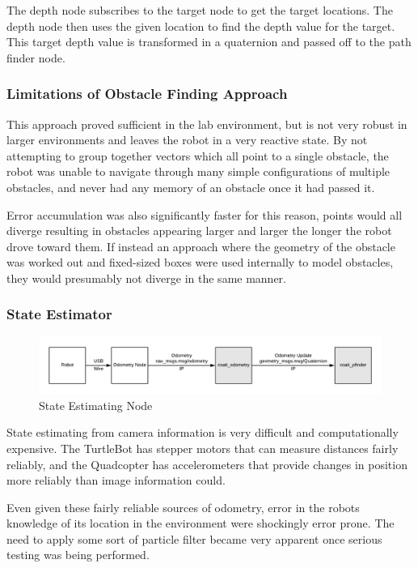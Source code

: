 \documentclass{article}[12]
\begin{document}
 	The depth node subscribes to the target node to get the target locations. The depth node then uses the given location to find the depth value for the target. This target depth value is transformed in a quaternion and passed off to the path finder node. 
 
 \subsubsection{Limitations of Obstacle Finding Approach}
 
 This approach proved sufficient in the lab environment, but is not very robust in larger environments and leaves the robot in a very reactive state. By not attempting to group together vectors which all point to a single obstacle, the robot was unable to navigate through many simple configurations of multiple obstacles, and never had any memory of an obstacle once it had passed it. 
 
 Error accumulation was also significantly faster for this reason, points would all diverge resulting in obstacles appearing larger and larger the longer the robot drove toward them. If instead an approach where the geometry of the obstacle was worked out and fixed-sized boxes were used internally to model obstacles, they would presumably not diverge in the same manner. 
	
	\subsubsection{State Estimator}
	
	\begin{figure}[H]
		\centering
		\includegraphics[width=0.9\linewidth]{OdometryDigram.png}
		\caption{State Estimating Node}
		\label{fig:state}
	\end{figure}

	State estimating from camera information is very difficult and computationally expensive. The TurtleBot has stepper motors that can measure distances fairly reliably, and the Quadcopter has accelerometers that provide changes in position more reliably than image information could. 
	
	Even given these fairly reliable sources of odometry, error in the robots knowledge of its location in the environment were shockingly error prone. The need to apply some sort of particle filter became very apparent once serious testing was being performed.
	
\end{document}
